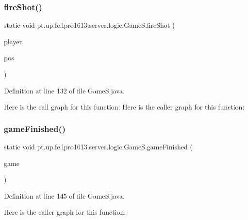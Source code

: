 \subsubsection{\texorpdfstring{fire\+Shot()}{fireShot()}}
{\footnotesize\ttfamily static void pt.\+up.\+fe.\+lpro1613.\+server.\+logic.\+Game\+S.\+fire\+Shot (\begin{DoxyParamCaption}\item[{\hyperlink{classpt_1_1up_1_1fe_1_1lpro1613_1_1server_1_1conn_1_1_client}{Client}}]{player,  }\item[{\hyperlink{classpt_1_1up_1_1fe_1_1lpro1613_1_1sharedlib_1_1utils_1_1_coord}{Coord}}]{pos }\end{DoxyParamCaption})\hspace{0.3cm}{\ttfamily [static]}}



Definition at line 132 of file Game\+S.\+java.

Here is the call graph for this function\+:
Here is the caller graph for this function\+:
\hypertarget{classpt_1_1up_1_1fe_1_1lpro1613_1_1server_1_1logic_1_1_game_s_aa8bc8390e9b27b09516dc5edcfdc7981}{}\label{classpt_1_1up_1_1fe_1_1lpro1613_1_1server_1_1logic_1_1_game_s_aa8bc8390e9b27b09516dc5edcfdc7981} 
\subsubsection{\texorpdfstring{game\+Finished()}{gameFinished()}}
{\footnotesize\ttfamily static void pt.\+up.\+fe.\+lpro1613.\+server.\+logic.\+Game\+S.\+game\+Finished (\begin{DoxyParamCaption}\item[{\hyperlink{classpt_1_1up_1_1fe_1_1lpro1613_1_1server_1_1logic_1_1game_1_1_game_play}{Game\+Play}}]{game }\end{DoxyParamCaption})\hspace{0.3cm}{\ttfamily [static]}}



Definition at line 145 of file Game\+S.\+java.

Here is the caller graph for this function\+:
\hypertarget{classpt_1_1up_1_1fe_1_1lpro1613_1_1server_1_1logic_1_1_game_s_a7ba4f1f49645551b9b9537981b66e6e9}{}\label{classpt_1_1up_1_1fe_1_1lpro1613_1_1server_1_1logic_1_1_game_s_a7ba4f1f49645551b9b9537981b66e6e9} 
